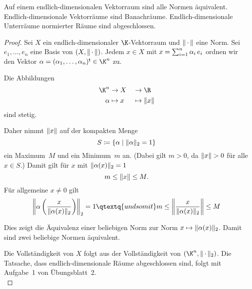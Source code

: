 \begin{thSatz}
    Auf einem endlich-dimensionalen Vektorraum sind alle Normen äquivalent.
    Endlich-dimensionale Vektorräume sind Banachräume. Endlich-dimensionale
    Unterräume normierter Räume sind abgeschlossen.
\end{thSatz}

\begin{proof}
    Sei $X$ ein endlich-dimensionaler $\K$-Vektorraum und $\emptyNorm$ eine Norm.
    Sei $e_1,\dots,e_n$ eine Basis von $(X,\emptyNorm)$. 
    Jedem $x\in X$ mit $x=\isum[1]^n \alpha_i\,e_i$ ordnen wir den Vektor
    $\alpha=(\alpha_1,\dots,\alpha_n)\mt \in\K^n$ zu.
    
    Die Abbildungen
    \begin{alignat*}{2}
        \K^n   &\to X     &&\to\R \\
        \alpha &\mapsto x &&\mapsto\norm{x}
    \end{alignat*}
    sind stetig.
    
    Daher nimmt $\norm{x}$ auf der kompakten Menge
    \[ S \defeq \{ \alpha \Mid \norm{\alpha}_2 = 1 \} \]
    ein Maximum~$M$ und ein Minimum~$m$ an. (Dabei gilt $m>0$, da $\norm{x}>0$
    für alle $x\in S$.)
    Damit gilt für $x$ mit $\norm{\alpha(x)}_2 = 1$
    \[ m \leq \norm{x} \leq M . \]
    Für allgemeine $x\neq0$ gilt
    \[ \norm*{ \alpha\left(\frac{x}{\norm{\alpha(x)}_2}\right) }_2 = 1 
        \qtextq{und somit}
        m \leq \norm*{\frac{x}{\norm{\alpha(x)}_2}} \leq M
    \]
    
    Dies zeigt die Äquivalenz einer beliebigen Norm zur Norm
    $x\mapsto\norm{\alpha(x)}_2$. Damit sind zwei beliebige Normen äquivalent.
    
    Die Vollständigkeit von $X$ folgt aus der Vollständigkeit von
    $(\K^n,\emptyNorm_2)$. Die Tatsache, dass endlich-dimensionale Räume
    abgeschlossen sind, folgt mit Aufgabe~1 von Übungsblatt~2.
    \\
\end{proof}



